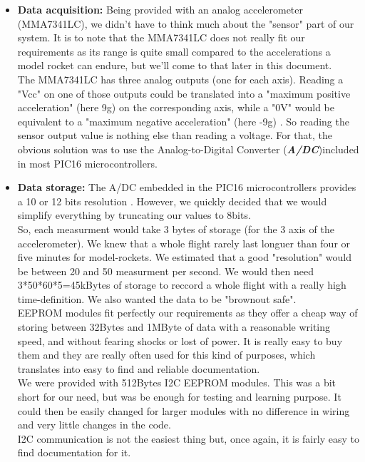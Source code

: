 \documentclass[12pt]{article}
\begin{document}
	\begin{itemize}
		\item \textbf{Data acquisition:} Being provided with an analog accelerometer (MMA7341LC), we didn't have to think much about the "sensor" part of our system. It is to note that the MMA7341LC does not really fit our requirements as its range is quite small compared to the accelerations a model rocket can endure, but we'll come to that later in this document.\\
		The MMA7341LC has three analog outputs (one for each axis). Reading a "Vcc" on one of those outputs could be translated into a "maximum positive acceleration" (here 9g) on the corresponding axis, while a "0V" would be equivalent to a "maximum negative acceleration" (here -9g) \cite{Acc}. So reading the sensor output value is nothing else than reading a voltage. For that, the obvious solution was to use the Analog-to-Digital Converter (\textit{\textbf{A/DC}})included in most PIC16 microcontrollers.
		\item \textbf{Data storage:} The A/DC embedded in the PIC16 microcontrollers provides a 10 or 12 bits resolution \cite{PIC}. However, we quickly decided that we would simplify everything by truncating our values to 8bits.\\
		So, each measurment would take 3 bytes of storage (for the 3 axis of the accelerometer). We knew that a whole flight rarely last longuer than four or five minutes for model-rockets.
		We estimated that a good "resolution" would be between 20 and 50 measurment per second. We would then need 3*50*60*5=45kBytes of storage to reccord a whole flight with a really high time-definition. We also wanted the data to be "brownout safe".\\
		EEPROM modules fit perfectly our requirements as they offer a cheap way of storing between 32Bytes and 1MByte of data with a reasonable writing speed, and without fearing shocks or lost of power. It is really easy to buy them and they are really often used for this kind of purposes, which translates into easy to find and reliable documentation.\\
		We were provided with 512Bytes I2C EEPROM modules. This was a bit short for our need, but was be enough for testing and learning purpose. It could then be easily changed for larger modules with no difference in wiring and very little changes in the code.\\
		I2C communication is not the easiest thing but, once again, it is fairly easy to find documentation for it.

\end{itemize}
\end{document}
